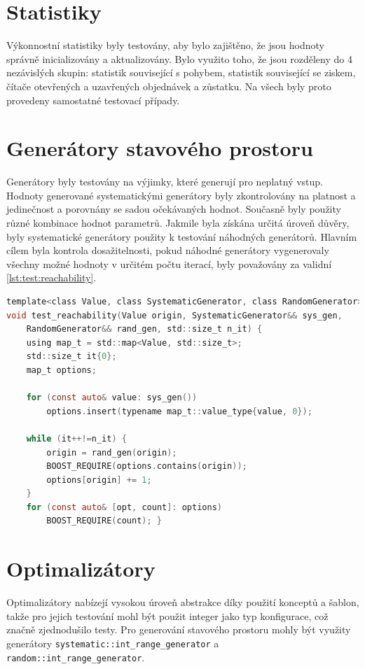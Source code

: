 \section{Statistiky}
Výkonnostní statistiky byly testovány, aby bylo zajištěno, že jsou hodnoty správně inicializovány a aktualizovány.
Bylo využito toho, že jsou rozděleny do 4 nezávislých skupin: statistik související s pohybem, statistik související se ziskem, čítače otevřených a uzavřených objednávek a zůstatku.
Na všech byly proto provedeny samostatné testovací případy.

\section{Generátory stavového prostoru}
Generátory byly testovány na výjimky, které generují pro neplatný vstup.
Hodnoty generované systematickými generátory byly zkontrolovány na platnost a jedinečnost a porovnány se sadou očekávaných hodnot.
Současně byly použity různé kombinace hodnot parametrů.
Jakmile byla získána určitá úroveň důvěry, byly systematické generátory použity k testování náhodných generátorů.
Hlavním cílem byla kontrola dosažitelnosti, pokud náhodné generátory vygenerovaly všechny možné hodnoty v určitém počtu iterací, byly považovány za validní \ref{lst:test:reachability}.

\begin{lstlisting}[caption={~Testování dosažitelnosti stavů},label={lst:test:reachability},captionpos=t,abovecaptionskip=-\medskipamount,belowcaptionskip=\medskipamount,language=C]
template<class Value, class SystematicGenerator, class RandomGenerator>
void test_reachability(Value origin, SystematicGenerator&& sys_gen,
    RandomGenerator&& rand_gen, std::size_t n_it) {
    using map_t = std::map<Value, std::size_t>;
    std::size_t it{0};
    map_t options;

    for (const auto& value: sys_gen())
        options.insert(typename map_t::value_type{value, 0});
        
    while (it++!=n_it) {
        origin = rand_gen(origin);
        BOOST_REQUIRE(options.contains(origin));
        options[origin] += 1;
    }
    for (const auto& [opt, count]: options)
        BOOST_REQUIRE(count); }
\end{lstlisting}

\section{Optimalizátory}
Optimalizátory nabízejí vysokou úroveň abstrakce díky použití konceptů a šablon, takže pro jejich testování mohl být použit integer jako typ konfigurace, což značně zjednodušilo testy.
Pro generování stavového prostoru mohly být využity generátory  \texttt{systematic::int\_range\_generator} a \texttt{random::int\_range\_generator}.

